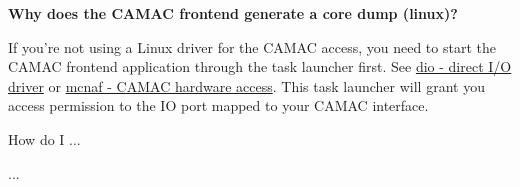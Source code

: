 \begin{DoxyEnumerate}
\item {\bfseries  Why does the CAMAC frontend generate a core dump (linux)? }
\begin{DoxyItemize}
\item If you're not using a Linux driver for the CAMAC access, you need to start the CAMAC frontend application through the task launcher first. See \hyperlink{FE_utils_FE_dio_utility}{dio -\/ direct I/O driver} or \hyperlink{FE_utils_FE_mcnaf_utility}{mcnaf -\/ CAMAC hardware access}. This task launcher will grant you access permission to the IO port mapped to your CAMAC interface. \par
\par

\end{DoxyItemize}


\item How do I ...
\begin{DoxyItemize}
\item ... \par
\par
 
\end{DoxyItemize}
\end{DoxyEnumerate}\label{index_end}
\hypertarget{index_end}{}
 \par
  \par
 